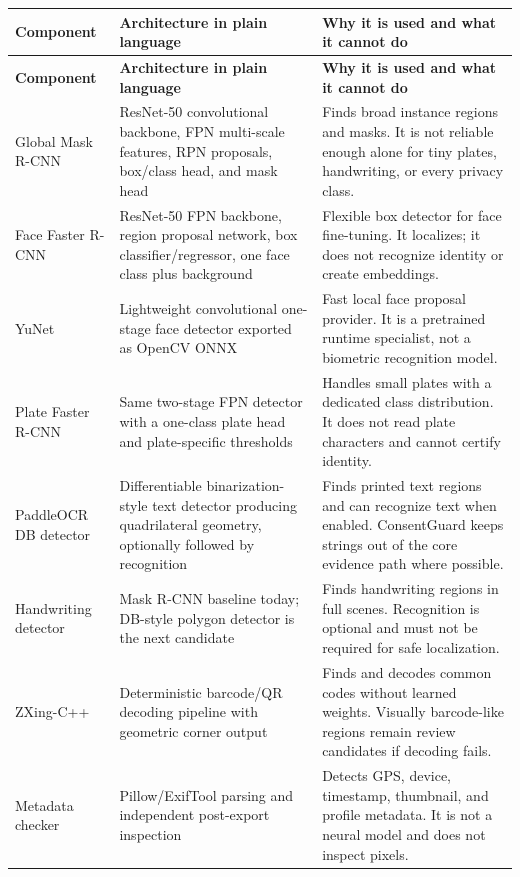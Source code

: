 \begin{longtable}{@{}L{31mm}L{49mm}L{53mm}@{}}
\toprule
\textbf{Component} & \textbf{Architecture in plain language} & \textbf{Why it is used and what it cannot do} \\
\midrule
\endfirsthead
\toprule
\textbf{Component} & \textbf{Architecture in plain language} & \textbf{Why it is used and what it cannot do} \\
\midrule
\endhead
Global Mask R-CNN & ResNet-50 convolutional backbone, FPN multi-scale features, RPN proposals, box/class head, and mask head & Finds broad instance regions and masks. It is not reliable enough alone for tiny plates, handwriting, or every privacy class. \\
Face Faster R-CNN & ResNet-50 FPN backbone, region proposal network, box classifier/regressor, one face class plus background & Flexible box detector for face fine-tuning. It localizes; it does not recognize identity or create embeddings. \\
YuNet & Lightweight convolutional one-stage face detector exported as OpenCV ONNX & Fast local face proposal provider. It is a pretrained runtime specialist, not a biometric recognition model. \\
Plate Faster R-CNN & Same two-stage FPN detector with a one-class plate head and plate-specific thresholds & Handles small plates with a dedicated class distribution. It does not read plate characters and cannot certify identity. \\
PaddleOCR DB detector & Differentiable binarization-style text detector producing quadrilateral geometry, optionally followed by recognition & Finds printed text regions and can recognize text when enabled. ConsentGuard keeps strings out of the core evidence path where possible. \\
Handwriting detector & Mask R-CNN baseline today; DB-style polygon detector is the next candidate & Finds handwriting regions in full scenes. Recognition is optional and must not be required for safe localization. \\
ZXing-C++ & Deterministic barcode/QR decoding pipeline with geometric corner output & Finds and decodes common codes without learned weights. Visually barcode-like regions remain review candidates if decoding fails. \\
Metadata checker & Pillow/ExifTool parsing and independent post-export inspection & Detects GPS, device, timestamp, thumbnail, and profile metadata. It is not a neural model and does not inspect pixels. \\
\bottomrule
\end{longtable}

